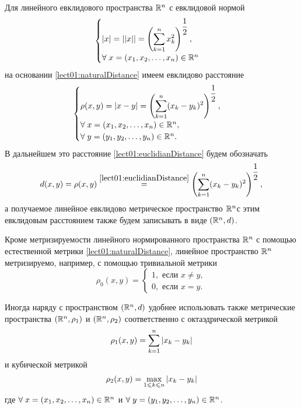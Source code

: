 \newpage
\begin{notes}
    \item Для линейного евклидового пространства $ \mathbb{R}^n $ с евклидовой нормой
    \begin{equation*}
	    \begin{cases}
			\left\lvert x \right\rvert = \left\lvert\left\lvert x\right\rvert\right\rvert = \left(\displaystyle\sum_{k=1}^{n} x_k^2\right)^{\dfrac{1}{2}}, \\
            \forall \; x = (x_1, x_2, \ldots, x_n) \in \mathbb{R}^n
        \end{cases}
    \end{equation*}
    на основании \eqref{lect01:naturalDistance} имеем евклидово расстояние 
    \begin{equation}
        \label{lect01:euclidianDistance}
        \begin{cases}
        	\rho(x,y) = \left\lvert x-y \right\rvert = \left(\displaystyle\sum_{k=1}^{n} (x_k-y_k)^2\right)^{\dfrac{1}{2}}, \\
            \forall \; x = (x_1, x_2, \ldots, x_n) \in \mathbb{R}^n, \\
            \forall \; y = (y_1, y_2, \ldots, y_n) \in \mathbb{R}^n.
        \end{cases}
    \end{equation}    
    В дальнейшем это расстояние \eqref{lect01:euclidianDistance} будем обозначать 
    \begin{equation*}
        d(x,y) = \rho(x,y) \overset{\eqref{lect01:euclidianDistance}}{=} \left(\displaystyle\sum_{k=1}^{n} (x_k-y_k)^2\right)^{\dfrac{1}{2}},
    \end{equation*}
    а получаемое линейное евклидово метрическое пространство $ \mathbb{R}^n $с этим евклидовым расстоянием также будем записывать в виде $ (\mathbb{R}^n, d) $.
    \item Кроме метризируемости линейного нормированного пространства $ \mathbb{R}^n $ с помощью естественной метрики \eqref{lect01:naturalDistance}, линейное пространство $ \mathbb{R}^n $ метризируемо, например, с помощью тривиальной метрики 
    \begin{equation*}
        \rho_0(x,y) =
        \begin{cases}
            1, \text{ если } x \neq y,\\
            0, \text{ если } x = y.
        \end{cases}
    \end{equation*}
    
    Иногда наряду с пространством $ (\mathbb{R}^n, d) $ удобнее использовать также метрические пространства $ (\mathbb{R}^n, \rho_1) $ и $ (\mathbb{R}^n, \rho_2) $ соответственно с октаэдрической метрикой
    \begin{equation*}
    	\rho_1(x, y) = \displaystyle\sum_{k=1}^{n} \left\lvert x_k - y_k \right\rvert
    \end{equation*}
    и кубической метрикой
    \begin{equation*}
      	\rho_2(x, y) = \max_{1 \leqslant k \leqslant n} \left\lvert x_k - y_k \right\rvert
    \end{equation*}
    где $ \forall \; x = (x_1, x_2, \ldots, x_n) \in \mathbb{R}^n $ и $ \forall \; y = (y_1, y_2, \ldots, y_n) \in \mathbb{R}^n $.
\end{notes}

